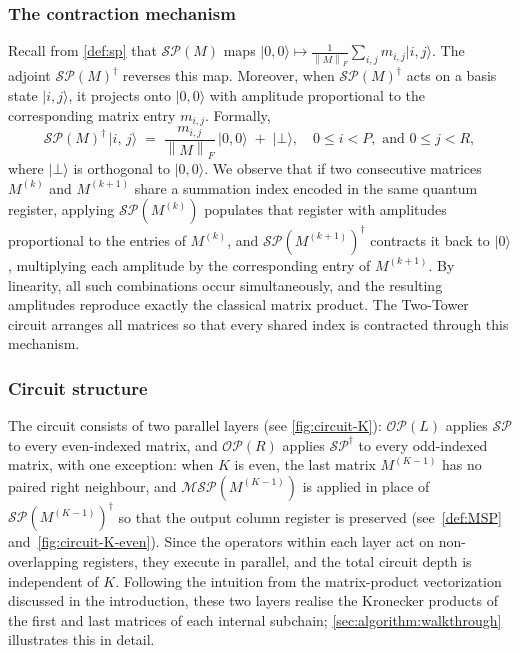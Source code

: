 \documentclass[a4paper,UKenglish,cleveref,autoref,thm-restate]{socg-lipics-v2021}
\providecommand{\ket}[1]{\lvert #1 \rangle}
\newcommand{\norm}[1]{\left\| #1 \right\|}
\newcommand{\SP}{\mathcal{SP}}        %
\newcommand{\MSP}{\mathcal{MSP}} %
\newcommand{\OP}{\mathcal{OP}}        %
\begin{document}
\subsubsection{The contraction mechanism}
Recall from \cref{def:sp} that $\SP(M)$ maps $\ket{0,0} \mapsto \frac{1}{\norm{M}_F}\sum_{i, j} m_{i, j}\ket{i, j}$. The adjoint $\SP(M)^\dagger$ reverses this map. Moreover, when $\SP(M)^\dagger$ acts on a basis state $\ket{i,j}$, it projects onto $\ket{0,0}$ with amplitude proportional to the corresponding matrix entry $m_{i,j}$. Formally,
\begin{equation}\label{eq:sp-collapse}
    \SP(M)^{\dagger}\,\ket{i,\,j}
    \;=\;
    \frac{m_{i,j}}{\norm{M}_F}\,\ket{0,0}
    \;+\; \ket{\bot}, \quad   0 \leq i < P, \text{ and } 0 \leq j < R,
\end{equation}
where $\ket{\bot}$ is orthogonal to $\ket{0,0}$. We observe that if two consecutive matrices $M^{(k)}$ and $M^{(k+1)}$ share a summation index encoded in the same quantum register, applying $\SP(M^{(k)})$ populates that register with amplitudes proportional to the entries of $M^{(k)}$, and $\SP(M^{(k+1)})^\dagger$ contracts it back to $\ket{0}$, multiplying each amplitude by the corresponding entry of $M^{(k+1)}$.
By linearity, all such combinations occur simultaneously, and the resulting amplitudes reproduce exactly the classical matrix product. The Two-Tower circuit arranges all matrices so that every shared index is contracted through this mechanism.

\subsubsection{Circuit structure}
The circuit consists of two parallel layers (see \cref{fig:circuit-K}):
$\OP(L)$ applies $\SP$ to every even-indexed matrix, and
$\OP(R)$ applies $\SP^\dagger$ to every odd-indexed matrix, with one exception: when $K$ is even, the last matrix $M^{(K-1)}$ has no paired right neighbour, and $\MSP(M^{(K-1)})$ is applied in place of $\SP(M^{(K-1)})^\dagger$ so that the output column register is preserved (see~\cref{def:MSP} and~\cref{fig:circuit-K-even}). Since the operators within each layer act on non-overlapping registers,
they execute in parallel, and the total circuit depth is independent
of $K$. Following the intuition from the matrix-product vectorization discussed in the introduction, these two layers realise the Kronecker products of the first and last matrices of each internal subchain; \cref{sec:algorithm:walkthrough} illustrates this in detail.
\end{document}

